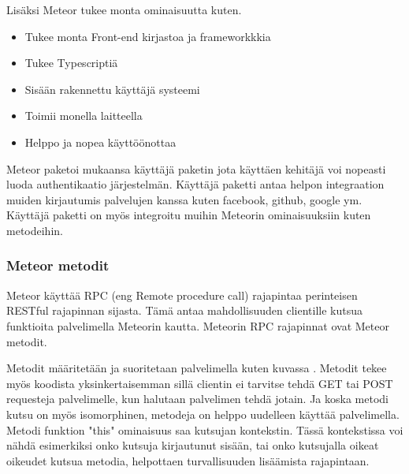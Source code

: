 \documentclass[11pt,a4paper,titlepage,oneside]{article}
\begin{document}
\medskip

    

Lisäksi Meteor tukee monta ominaisuutta kuten. 
\begin{itemize}
    \item Tukee monta Front-end kirjastoa ja frameworkkkia
    \item Tukee Typescriptiä
    \item Sisään rakennettu käyttäjä systeemi
    \item Toimii monella laitteella
    \item Helppo ja nopea käyttöönottaa 
\end{itemize}
\medskip


Meteor paketoi mukaansa käyttäjä paketin jota käyttäen kehitäjä voi nopeasti luoda authentikaatio järjestelmän.
Käyttäjä paketti antaa helpon integraation muiden kirjautumis palvelujen kanssa kuten facebook, github, google ym. 
Käyttäjä paketti on myös integroitu muihin Meteorin ominaisuuksiin kuten metodeihin.



\subsubsection{Meteor metodit}





Meteor käyttää RPC (eng Remote procedure call) rajapintaa  perinteisen RESTful rajapinnan sijasta. %
Tämä antaa mahdollisuuden clientille kutsua funktioita palvelimella Meteorin kautta.
Meteorin RPC rajapinnat ovat Meteor metodit.
\medskip


Metodit määritetään ja suoritetaan palvelimella kuten kuvassa \nextImageCount.
Metodit tekee myös koodista yksinkertaisemman sillä clientin ei tarvitse tehdä GET tai POST requesteja palvelimelle, kun halutaan palvelimen tehdä jotain. 
Ja koska metodi kutsu on myös isomorphinen, metodeja on helppo uudelleen käyttää palvelimella.
Metodi funktion "this"{} ominaisuus saa kutsujan kontekstin. 
Tässä kontekstissa voi nähdä esimerkiksi onko kutsuja kirjautunut sisään, tai onko kutsujalla oikeat oikeudet kutsua metodia, 
helpottaen turvallisuuden lisäämista rajapintaan.
\bigskip
\end{document}
